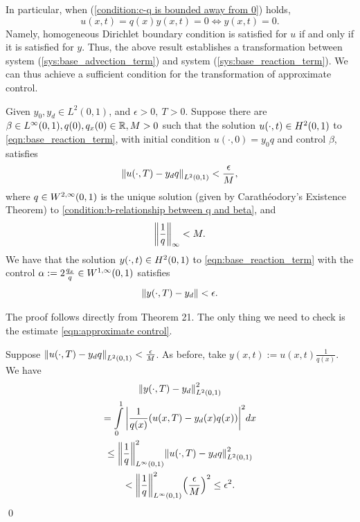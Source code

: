 \documentclass{ifacconf}
\begin{document}
In particular, when (\ref{condition:c-q is bounded away from 0}) holds, $$u(x,t) = q(x)y(x,t) = 0 \iff y(x, t) = 0.$$ 
Namely, homogeneous Dirichlet boundary condition is satisfied for $u$ if and only if it is satisfied for $y$. Thus, the above result establishes a transformation between system (\ref{sys:base_advection_term}) and system (\ref{sys:base_reaction_term}).
We can thus achieve a sufficient condition for the transformation of approximate control.

\begin{cor}
\label{Sufficient Condition for Transformation of Approximate Control}
    \cite[Corollary~4.1.9]{yixing_multiplicative_2025}
    Given $y_0, y_d \in L^2(0,1)$, and $\epsilon > 0, ~ T > 0$. Suppose there are $\beta \in {L^{\infty}_{}{\left ( 0,1 \right )}}, q(0), q_x(0)\in {\mathbb{R}}, M > 0$ such that the solution $u(\cdot, t) \in {H^{2}_{}{\left ( 0,1 \right )}}$ to \eqref{eqn:base_reaction_term}, with initial condition $u(\cdot, 0) = y_0q$ and control $\beta$, satisfies   
    \begin{equation}
    \label{eqn:reduced approximate control through reaction term}
        {\left\| u(\cdot, T) - y_dq\right\|}_{L^{2}_{}{\left ( 0,1 \right )}} < \frac{\epsilon}{M},
    \end{equation}
    where $q \in {W^{2, \infty}_{}{\left ( 0,1 \right )}}$ is the unique solution (given by Carathéodory's Existence Theorem) to \eqref{condition:b-relationship between q and beta}, and 
    \begin{equation}
        {\left\| \frac{1}{q}\right\|}_\infty < M.
    \end{equation}
    We have that the solution $y(\cdot, t) \in {H^{2}_{}{\left ( 0,1 \right )}}$ to \eqref{eqn:base_reaction_term} with the control $\alpha := 2\frac{q_x}{q} \in {W^{1,\infty}_{}{\left ( 0,1 \right )}}$ satisfies   
    \begin{equation}
    \label{eqn:approximate control}
        {\left\| y(\cdot, T) - y_d\right\|} < \epsilon.
    \end{equation}
\end{cor}
\begin{pf}    
    The proof follows directly from Theorem 21. The only thing we need to check is the estimate \eqref{eqn:approximate control}.
    
    Suppose ${\left\| u(\cdot, T) - y_dq\right\|}_{L^{2}_{}{\left ( 0,1 \right )}} < \frac{\epsilon}{M}$.     
    As before, take $y(x, t) := u(x, t)\frac{1}{q(x)}$. We have
    \begin{multline*}
        \norm{y(\cdot, T) - y_d}_\Leb{2}{}{0,1}^2 \\        
        = \int_0^1\abs{\frac{1}{q(x)}\rndbracket{u(x, T) - y_d(x)q(x)}}^2dx\\
        \leq \norm{\frac{1}{q}}_\Leb{\infty}{}{0,1}^2\norm{u(\cdot, T) - y_dq}_\Leb{2}{}{0,1}^2\\
        < \norm{\frac{1}{q}}_\Leb{\infty}{}{0,1}^2\rndbracket{\frac{\epsilon}{M}}^2
        \leq \epsilon^2.
    \end{multline*}
    \qed
\end{pf}
\end{document}
